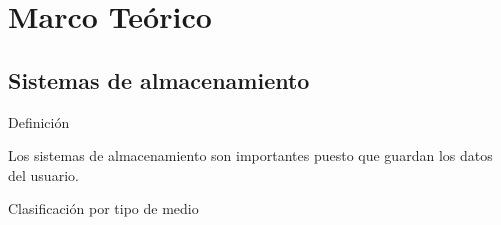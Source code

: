   \chapter{Marco Te\'{o}rico}
  \label{chap:cap1}
    \section {Sistemas de almacenamiento}
    
Definici\'{o}n

Los sistemas de almacenamiento son importantes puesto que guardan los datos del usuario.

%

Clasificaci\'{o}n por tipo de medio \cite{_ibm_????}

